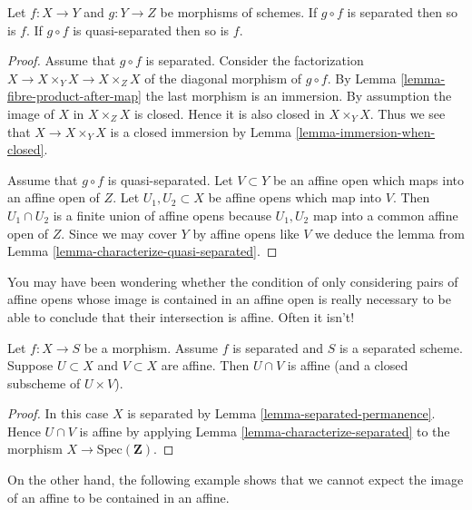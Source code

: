 \begin{lemma}
\label{lemma-compose-after-separated}
Let $f : X \to Y$ and $g : Y \to Z$ be morphisms of schemes.
If $g \circ f$ is separated then so is $f$.
If $g \circ f$ is quasi-separated then so is $f$.
\end{lemma}

\begin{proof}
Assume that $g \circ f$ is separated.
Consider the factorization $X \to X \times_Y X \to X \times_Z X$
of the diagonal morphism of $g \circ f$.
By Lemma \ref{lemma-fibre-product-after-map}
the last morphism is an immersion. By assumption the image
of $X$ in $X \times_Z X$ is closed. Hence it is also closed
in $X \times_Y X$. Thus we see that $X \to X \times_Y X$
is a closed immersion by Lemma \ref{lemma-immersion-when-closed}.

\medskip\noindent
Assume that $g \circ f$ is quasi-separated.
Let $V \subset Y$ be an affine open which maps into an affine
open of $Z$. Let $U_1, U_2 \subset X$ be affine opens which
map into $V$. Then $U_1 \cap U_2$ is a finite union of affine
opens because $U_1, U_2$ map into a common affine open
of $Z$. Since we may cover $Y$ by affine opens like $V$ we
deduce the lemma from Lemma \ref{lemma-characterize-quasi-separated}.
\end{proof}

\noindent
You may have been wondering whether the condition
of only considering pairs of affine opens whose image is contained
in an affine open is really necessary to be able to conclude
that their intersection is affine. Often it isn't!

\begin{lemma}
\label{lemma-curiosity}
Let $f : X \to S$ be a morphism.
Assume $f$ is separated and $S$ is a separated scheme.
Suppose $U \subset X$ and $V \subset X$ are affine.
Then $U \cap V$ is affine (and a closed subscheme of $U \times V$).
\end{lemma}

\begin{proof}
In this case $X$ is separated by Lemma \ref{lemma-separated-permanence}.
Hence $U \cap V$ is affine by
applying Lemma \ref{lemma-characterize-separated} to the
morphism $X \to \text{Spec}(\mathbf{Z})$.
\end{proof}

\noindent
On the other hand, the following example shows that we cannot
expect the image of an affine to be contained in an affine.


